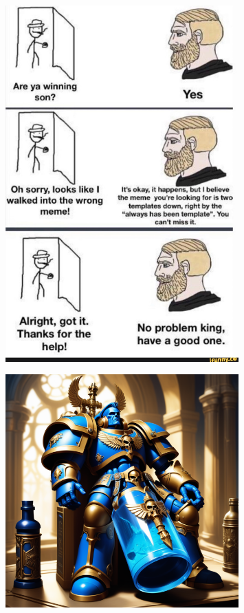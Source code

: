 \documentclass[a4paper]{article}
\begin{document}
\begin{figure}[htbp]
\centering
\includegraphics[width=0.8\textwidth]{meme-wrong-meme.jpg}

\label{fig:meme-wrong-meme}
\end{figure}

\begin{figure}[htbp]
\centering
\includegraphics[width=0.8\textwidth]{meme-transformer.png}

\label{fig:meme-transformer}
\end{figure}
\end{document}
